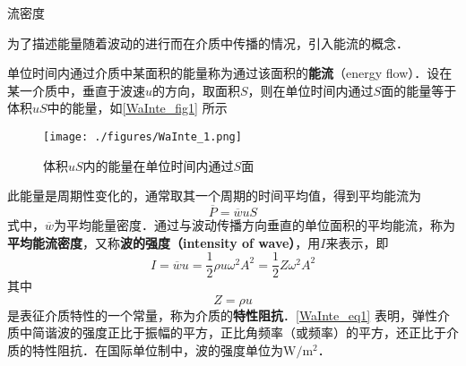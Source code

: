 
流密度

为了描述能量随着波动的进行而在介质中传播的情况，引入能流的概念．

单位时间内通过介质中某面积的能量称为通过该面积的\textbf{能流}（energy flow）．设在某一介质中，垂直于波速$u$的方向，取面积$S$，则在单位时间内通过$S$面的能量等于体积$uS$中的能量，如\autoref{WaInte_fig1} 所示
\begin{figure}[ht]
\centering
\texttt{[image: ./figures/WaInte\_1.png]}
\caption{体积$uS$内的能量在单位时间内通过$S$面} \label{WaInte_fig1}
\end{figure}

此能量是周期性变化的，通常取其一个周期的时间平均值，得到平均能流为
\begin{equation}
\overline{P}=\overline{w} u S
\end{equation}
式中，$\overline w$为平均能量密度．通过与波动传播方向垂直的单位面积的平均能流，称为\textbf{平均能流密度}，又称\textbf{波的强度（intensity of wave）}，用$I$来表示，即
\begin{equation} \label{WaInte_eq1}
I=\overline{w} u=\frac{1}{2} \rho u \omega^{2} A^{2}=\frac{1}{2} Z \omega^{2} A^{2}
\end{equation}
其中
\begin{equation}
Z=\rho u
\end{equation}
是表征介质特性的一个常量，称为介质的\textbf{特性阻抗}．\autoref{WaInte_eq1} 表明，弹性介质中简谐波的强度正比于振幅的平方，正比角频率（或频率）的平方，还正比于介质的特性阻抗．在国际单位制中，波的强度单位为$\mathrm{W}/\mathrm{m^2}$．